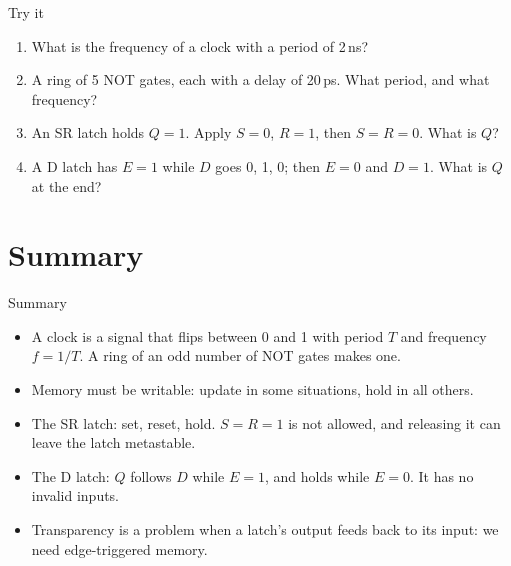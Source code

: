 \documentclass[10pt]{wosm-slides}
\begin{document}
\begin{frame}{Try it}
  \begin{enumerate}
    \item What is the frequency of a clock with a period of 2\,ns?\par
    \item A ring of 5 NOT gates, each with a delay of 20\,ps. What period, and what
      frequency?\par
    \item An SR latch holds $Q = 1$. Apply $S = 0$, $R = 1$, then $S = R = 0$. What is
      $Q$?\par
    \item A D latch has $E = 1$ while $D$ goes 0, 1, 0; then $E = 0$ and $D = 1$.
      What is $Q$ at the end?\par
  \end{enumerate}
\end{frame}

\section{Summary}

\begin{frame}{Summary}
  \begin{itemize}
    \item A clock is a signal that flips between 0 and 1 with period $T$ and frequency
      $f = 1/T$. A ring of an odd number of NOT gates makes one.
    \item Memory must be writable: update in some situations, hold in all others.
    \item The SR latch: set, reset, hold. $S = R = 1$ is not allowed, and releasing it
      can leave the latch metastable.
    \item The D latch: $Q$ follows $D$ while $E = 1$, and holds while $E = 0$. It has no
      invalid inputs.
    \item Transparency is a problem when a latch's output feeds back to its input:
      we need edge-triggered memory.
  \end{itemize}
\end{frame}
\end{document}
